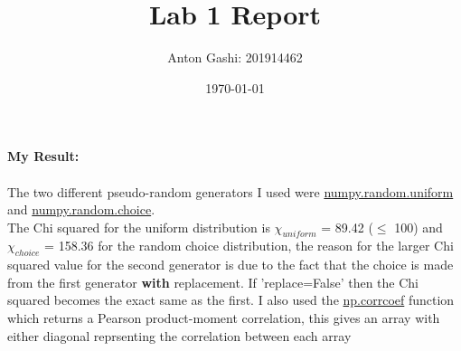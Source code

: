 \documentclass[12pt, A4]{article}
\title{Lab 1 Report}
\author{Anton Gashi: 201914462}
\date{\today}
\begin{document}
\textbf{My Result:} \\ \\ The two different pseudo-random generators I used were \href{https://numpy.org/doc/stable/reference/random/generated/numpy.random.uniform.html}{numpy.random.uniform} and \href{https://numpy.org/doc/stable/reference/random/generated/numpy.random.choice.html}{numpy.random.choice}. \\ The Chi squared for the uniform distribution is $\chi_{uniform}$ = 89.42 ($\le$ 100) and $\chi_{choice}$ = 158.36 for the random choice distribution, the reason for the larger Chi squared value for the second generator is due to the fact that the choice is made from the first generator \textbf{with} replacement. If 'replace=False' then the Chi squared becomes the exact same as the first. I also used the \href{"https://numpy.org/doc/stable/reference/generated/numpy.corrcoef.html"}{np.corrcoef} function which returns a Pearson product-moment correlation, this gives an array with either diagonal reprsenting the correlation between each array
\end{document}

